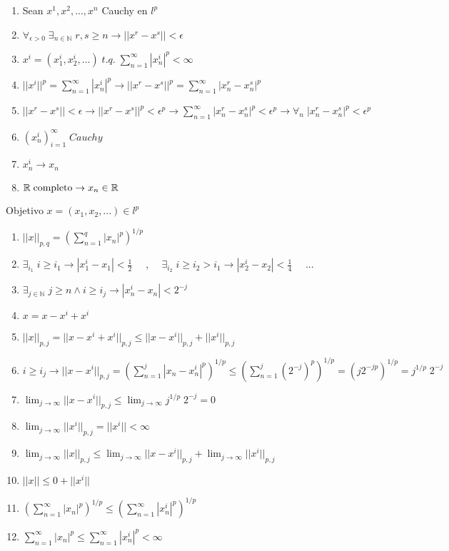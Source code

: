 \begin{enumerate}
  \item Sean $x^1, x^2, ... , x^n$ Cauchy en $l^p$
  \item $\forall_{\epsilon > 0} \; \exists_{n \in \mathbb{N}} \; r,s \geq n \to ||x^r - x^s|| < \epsilon$
  \item $x^i = (x_1^i, x_2^i, ...) \; t.q. \; \sum_{n=1}^\infty |x_n^i|^p < \infty$
  \item $||x^i||^p = \sum_{n=1}^\infty |x_n^i|^p \to ||x^r - x^s||^p = \sum_{n=1}^\infty |x_n^r - x_n^s|^p$
  \item $||x^r - x^s|| < \epsilon \to ||x^r - x^s||^p < \epsilon^p \to \sum_{n=1}^\infty |x_n^r - x_n^s|^p < \epsilon^p \to \forall_n \; |x_n^r - x_n^s|^p < \epsilon^p$
  \item $(x_n^i)_{i=1}^\infty \; Cauchy$
  \item $x_n^i \to x_n$
  \item $\mathbb{R} \; \textnormal{completo} \to x_n \in \mathbb{R}$
\end{enumerate}

Objetivo $x = (x_1, x_2, ...) \in l^p$

\begin{enumerate}
  \item $||x||_{p,q} = (\sum_{n=1}^q |x_n|^p)^{1/p}$
  \item $\exists_{i_1} \; i \geq i_1 \to |x_1^{i} - x_1| < \frac{1}{2} \quad$ , $\quad \exists_{i_2} \; i \geq i_2 > i_1 \to |x_2^{i} - x_2| < \frac{1}{4} \quad$ ...
  \item $\exists_{j \in \mathbb{N}} \; j \geq n \land i \geq i_j \to |x_n^{i} - x_n| < 2^{-j}$
  \item $x = x - x^{i} + x^{i}$
  \item $||x||_{p,j} = ||x - x^{i} + x^{i}||_{p,j} \leq ||x - x^{i}||_{p,j} + ||x^{i}||_{p,j}$
  \item $i \geq i_j \to ||x - x^{i}||_{p,j} = (\sum_{n=1}^j |x_n - x_n^{i}|^p)^{1/p} \leq (\sum_{n=1}^j (2^{-j})^p)^{1/p} = (j2^{-jp})^{1/p} = j^{1/p} \; 2^{-j}$
  \item $\lim_{j \to \infty} ||x - x^{i}||_{p,j} \leq \lim_{j \to \infty} j^{1/p} \; 2^{-j} = 0$
  \item $\lim_{j \to \infty} ||x^{i}||_{p,j} = ||x^{i}|| < \infty$
  \item $\lim_{j \to \infty} ||x||_{p,j} \leq \lim_{j \to \infty} ||x - x^{i}||_{p,j} + \lim_{j \to \infty} ||x^{i}||_{p,j} $
  \item $||x|| \leq 0 + ||x^{i}||$
  \item $(\sum_{n=1}^\infty |x_n|^p)^{1/p} \leq (\sum_{n=1}^\infty |x_n^i|^p)^{1/p} $
  \item $\sum_{n=1}^\infty |x_n|^p \leq \sum_{n=1}^\infty |x_n^i|^p < \infty $
\end{enumerate}

